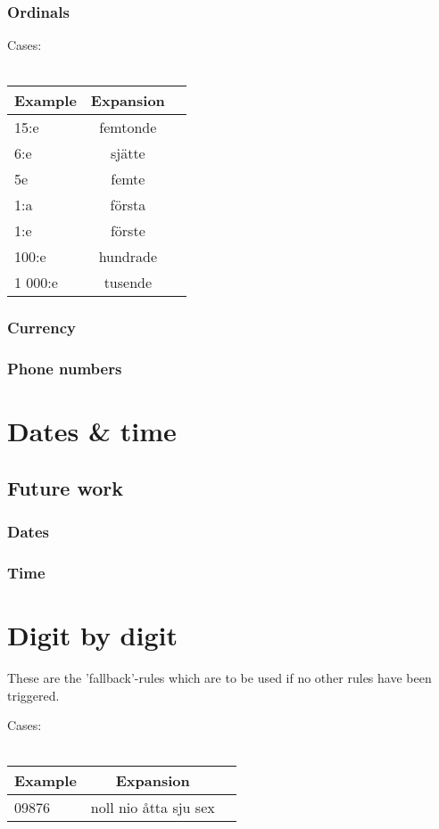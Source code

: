 \documentclass[10pt,a4paper]{article}
\begin{document}
\subsubsection{Ordinals}
Cases:\\
\\
\begin{tabular}{|l|c|r|}\hline
  Example & Expansion \\ \hline
  15:e & femtonde \\
  6:e & sjätte \\
  5e & femte \\
  1:a & första \\
  1:e & förste \\
  100:e & hundrade \\
  1 000:e & tusende \\\hline  
\end{tabular}

\subsubsection{Currency}

\subsubsection{Phone numbers}


\section{Dates \& time}

\subsection{Future work}

\subsubsection{Dates}

\subsubsection{Time}


\section{Digit by digit}
These are the 'fallback'-rules which are to be used if no other rules have been triggered.

Cases:\\
\\
\begin{tabular}{|l|c|r|}\hline
  Example & Expansion \\ \hline
  09876 & noll nio åtta sju sex\\\hline  
\end{tabular}
\end{document}
